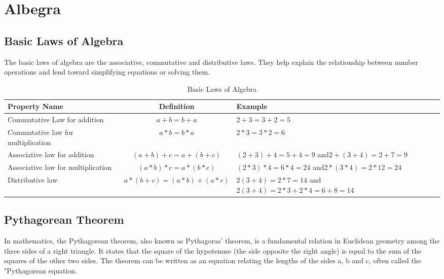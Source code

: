 

\chapter{Albegra}
\section{Basic Laws of Algebra}
The basic laws of algebra are the associative, commutative and distributive laws. They help explain the relationship between number operations and lend toward simplifying equations or solving them.
\begin{table}[h]
	\centering
	\begin{tabular}{|m{4cm}|c|m{6cm}|}
		\hline
		Property Name & Definition & Example \\ \hline
		Commutative Law for addition & $a+b = b+ a$ & $2+3 = 3+2 = 5$ \\ \hline
		Commutative law for multiplication & $a * b = b * a$ & $2 * 3 = 3 * 2 = 6$ \\ \hline
		Associative law for addition & $(a+b) + c = a + (b+c)$ & $(2+3) + 4 = 5 + 4 = 9$ and\newline $2 + (3+4) = 2 + 7 = 9$ \\ \hline
		Associative law for multiplication & $(a*b)*c = a* (b*c)$ & $(2*3) *4 = 6*4 = 24$ and\newline$2*(3*4) = 2*12=24$ \\ \hline
		Distributive law & $a*(b+c) = (a*b) + (a*c)$ & $2(3+4) = 2*7=14$ and\newline  $2(3+4) = 2*3 + 2*4 = 6+8 = 14$ \\
		\hline
	\end{tabular}
	\caption{Basic Laws of Algebra}
\end{table}
\newpage
\section{Pythagorean Theorem}

In mathematics, the Pythagorean theorem, also known as Pythagoras' theorem, is a fundamental relation in Euclidean geometry among the three sides of a right triangle. It states that the square of the hypotenuse (the side opposite the right angle) is equal to the sum of the squares of the other two sides. The theorem can be written as an equation relating the lengths of the sides a, b and c, often called the "Pythagorean equation.

